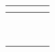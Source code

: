\documentclass[11pt,a4paper]{article}
\begin{document}
\begin{center}
\begin{longtable}[h]{ | p{2.3cm} | p{2.3cm} | p{12.6cm} | p{1.2cm} | }
	
	
	\multicolumn{3}{c}{} \\ 
	\hline 
	
	
	
	{\large } & & \makecell[l]{$\bullet$  } &  \\ \cline{2-4}
	
	&  & \makecell[l]{$\bullet$  }  &  \\ \cline{2-4}
	
	&  & \makecell[l]{$\bullet$  }  &  \\ \cline{2-4}
	
	&  & \makecell[l]{$\bullet$  }  &  \\ \cline{2-4}
	
	&  & \makecell[l]{$\bullet$  }  &  \\ \cline{2-4}
	
	&  & \makecell[l]{$\bullet$  }  &  \\ \cline{2-4}
	
	&  & \makecell[l]{$\bullet$  }  &  \\ 
	\hline
	
	
	
	\multicolumn{3}{c}{} \\ 

	
	 
	 
\end{longtable}
\end{center}
\end{document}
